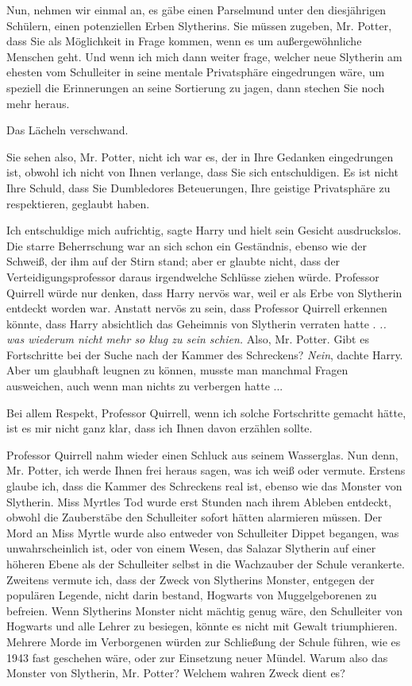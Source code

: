 \glqq{}Nun, nehmen wir einmal an, es gäbe einen Parselmund unter den diesjährigen
Schülern, einen potenziellen Erben Slytherins. Sie müssen zugeben, Mr. Potter,
dass Sie als Möglichkeit in Frage kommen, wenn es um außergewöhnliche Menschen
geht. Und wenn ich mich dann weiter frage, welcher neue Slytherin am ehesten vom
Schulleiter in seine mentale Privatsphäre eingedrungen wäre, um speziell die
Erinnerungen an seine Sortierung zu jagen, dann stechen Sie noch mehr heraus.\grqq{}

Das Lächeln verschwand.

\glqq{}Sie sehen also, Mr. Potter, nicht ich war es, der in Ihre Gedanken
eingedrungen ist, obwohl ich nicht von Ihnen verlange, dass Sie sich
entschuldigen. Es ist nicht Ihre Schuld, dass Sie Dumbledores Beteuerungen, Ihre
geistige Privatsphäre zu respektieren, geglaubt haben.\grqq{}

\glqq{}Ich entschuldige mich aufrichtig\grqq{}, sagte Harry und hielt sein
Gesicht ausdruckslos. Die starre Beherrschung war an sich schon ein Geständnis,
ebenso wie der Schweiß, der ihm auf der Stirn stand; aber er glaubte nicht, dass
der Verteidigungsprofessor daraus irgendwelche Schlüsse ziehen würde. Professor
Quirrell würde nur denken, dass Harry nervös war, weil er als Erbe von Slytherin
entdeckt worden war. Anstatt nervös zu sein, dass Professor Quirrell erkennen
könnte, dass Harry absichtlich das Geheimnis von Slytherin verraten hatte .
\emph{.. was wiederum nicht mehr so klug zu sein schien.} \glqq{}Also, Mr.
Potter. Gibt es Fortschritte bei der Suche nach der Kammer des Schreckens?\grqq{}
\emph{Nein}, dachte Harry. Aber um glaubhaft leugnen zu können, musste man
manchmal Fragen ausweichen, auch wenn man nichts zu verbergen hatte ...

\glqq{}Bei allem Respekt, Professor Quirrell, wenn ich solche Fortschritte
gemacht hätte, ist es mir nicht ganz klar, dass ich Ihnen davon erzählen
sollte.\grqq{}

Professor Quirrell nahm wieder einen Schluck aus seinem Wasserglas. \glqq{}Nun
denn, Mr. Potter, ich werde Ihnen frei heraus sagen, was ich weiß oder vermute.
Erstens glaube ich, dass die Kammer des Schreckens real ist, ebenso wie das
Monster von Slytherin. Miss Myrtles Tod wurde erst Stunden nach ihrem Ableben
entdeckt, obwohl die Zauberstäbe den Schulleiter sofort hätten alarmieren
müssen. Der Mord an Miss Myrtle wurde also entweder von Schulleiter Dippet
begangen, was unwahrscheinlich ist, oder von einem Wesen, das Salazar Slytherin
auf einer höheren Ebene als der Schulleiter selbst in die Wachzauber der Schule
verankerte. Zweitens vermute ich, dass der Zweck von Slytherins Monster,
entgegen der populären Legende, nicht darin bestand, Hogwarts von
Muggelgeborenen zu befreien. Wenn Slytherins Monster nicht mächtig genug wäre,
den Schulleiter von Hogwarts und alle Lehrer zu besiegen, könnte es nicht mit
Gewalt triumphieren. Mehrere Morde im Verborgenen würden zur Schließung der
Schule führen, wie es 1943 fast geschehen wäre, oder zur Einsetzung neuer
Mündel. Warum also das Monster von Slytherin, Mr. Potter? Welchem wahren Zweck
dient es?\grqq{}

